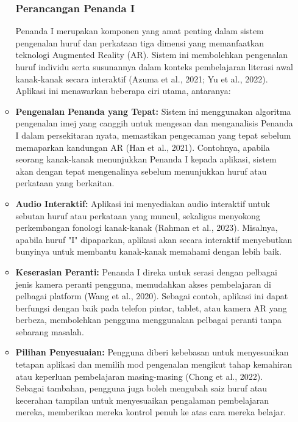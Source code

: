 \begin{itemize}
\begin{itemize}
\subsubsection{Perancangan Penanda I}

Penanda I merupakan komponen yang amat penting dalam sistem pengenalan huruf dan perkataan tiga dimensi yang memanfaatkan teknologi Augmented Reality (AR). Sistem ini membolehkan pengenalan huruf individu serta susunannya dalam konteks pembelajaran literasi awal kanak-kanak secara interaktif (Azuma et al., 2021; Yu et al., 2022). Aplikasi ini menawarkan beberapa ciri utama, antaranya:\\  

\item \textbf{Pengenalan Penanda yang Tepat:} Sistem ini menggunakan algoritma pengenalan imej yang canggih untuk mengesan dan menganalisis Penanda I dalam persekitaran nyata, memastikan pengecaman yang tepat sebelum memaparkan kandungan AR (Han et al., 2021). Contohnya, apabila seorang kanak-kanak menunjukkan Penanda I kepada aplikasi, sistem akan dengan tepat mengenalinya sebelum menunjukkan huruf atau perkataan yang berkaitan.  \\
\item \textbf{Audio Interaktif:} Aplikasi ini menyediakan audio interaktif untuk sebutan huruf atau perkataan yang muncul, sekaligus menyokong perkembangan fonologi kanak-kanak (Rahman et al., 2023). Misalnya, apabila huruf "I" dipaparkan, aplikasi akan secara interaktif menyebutkan bunyinya untuk membantu kanak-kanak memahami dengan lebih baik.  \\
\item \textbf{Keserasian Peranti:} Penanda I direka untuk serasi dengan pelbagai jenis kamera peranti pengguna, memudahkan akses pembelajaran di pelbagai platform (Wang et al., 2020). Sebagai contoh, aplikasi ini dapat berfungsi dengan baik pada telefon pintar, tablet, atau kamera AR yang berbeza, membolehkan pengguna menggunakan pelbagai peranti tanpa sebarang masalah.  \\
\item \textbf{Pilihan Penyesuaian:} Pengguna diberi kebebasan untuk menyesuaikan tetapan aplikasi dan memilih mod pengenalan mengikut tahap kemahiran atau keperluan pembelajaran masing-masing (Chong et al., 2022). Sebagai tambahan, pengguna juga boleh mengubah saiz huruf atau kecerahan tampilan untuk menyesuaikan pengalaman pembelajaran mereka, memberikan mereka kontrol penuh ke atas cara mereka belajar.  \\



\end{itemize}
\end{itemize}
